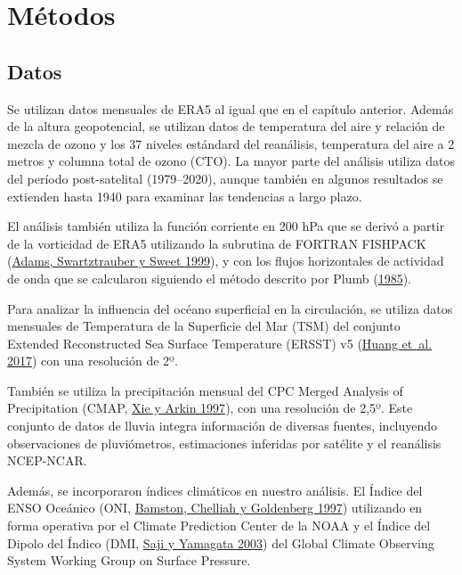 \documentclass[12pt,oneside,a4paper]{reedthesis}
\begin{document}
\hypertarget{muxe9todos-1}{%
\section{Métodos}\label{muxe9todos-1}}

\hypertarget{datos-1}{%
\subsection{Datos}\label{datos-1}}

Se utilizan datos mensuales de ERA5 al igual que en el capítulo anterior.
Además de la altura geopotencial, se utilizan datos de temperatura del aire y relación de mezcla de ozono y los 37 niveles estándard del reanálisis, temperatura del aire a 2 metros y columna total de ozono (CTO).
La mayor parte del análisis utiliza datos del período post-satelital (1979--2020), aunque también en algunos resultados se extienden hasta 1940 para examinar las tendencias a largo plazo.

El análisis también utiliza la función corriente en 200 hPa que se derivó a partir de la vorticidad de ERA5 utilizando la subrutina de FORTRAN FISHPACK (\protect\hyperlink{ref-fishpack}{Adams, Swartztrauber y Sweet 1999}), y con los flujos horizontales de actividad de onda que se calcularon siguiendo el método descrito por Plumb (\protect\hyperlink{ref-plumb1985}{1985}).

Para analizar la influencia del océano superficial en la circulación, se utiliza datos mensuales de Temperatura de la Superficie del Mar (TSM) del conjunto Extended Reconstructed Sea Surface Temperature (ERSST) v5 (\protect\hyperlink{ref-huang2017}{Huang et~al. 2017}) con una resolución de 2º.

También se utiliza la precipitación mensual del CPC Merged Analysis of Precipitation (CMAP, \protect\hyperlink{ref-xie1997}{Xie y Arkin 1997}), con una resolución de 2,5º.
Este conjunto de datos de lluvia integra información de diversas fuentes, incluyendo observaciones de pluviómetros, estimaciones inferidas por satélite y el reanálisis NCEP-NCAR.

Además, se incorporaron índices climáticos en nuestro análisis.
El Índice del ENSO Oceánico (ONI, \protect\hyperlink{ref-bamston1997}{Bamston, Chelliah y Goldenberg 1997}) utilizando en forma operativa por el Climate Prediction Center de la NOAA y el Índice del Dipolo del Índico (DMI, \protect\hyperlink{ref-saji2003}{Saji y Yamagata 2003}) del Global Climate Observing System Working Group on Surface Pressure.
\end{document}
